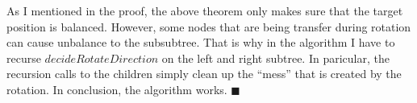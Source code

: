 \documentclass[12pt]{article}
\begin{document}
As I mentioned in the proof, the above theorem only makes sure that the target position is balanced.
However, some nodes that are being transfer during rotation can cause unbalance to the subsubtree.
That is why in the algorithm I have to recurse $decideRotateDirection$ on the left and right subtree.
In paricular, the recursion calls to the children simply clean up the ``mess'' that is created by the rotation. In conclusion, the algorithm works.
\hfill $\blacksquare$
\end{document}
